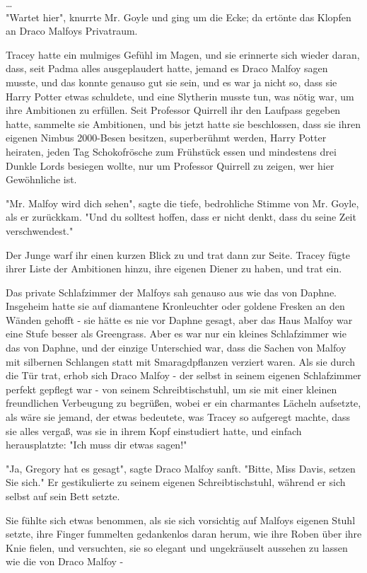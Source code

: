 {…\\ "Wartet hier", knurrte Mr. Goyle und ging um die Ecke; da ertönte das Klopfen an Draco Malfoys Privatraum.

Tracey hatte ein mulmiges Gefühl im Magen, und sie erinnerte sich wieder daran, dass, seit Padma alles ausgeplaudert hatte, jemand es Draco Malfoy sagen musste, und das konnte genauso gut sie sein, und es war ja nicht so, dass sie Harry Potter etwas schuldete, und eine Slytherin musste tun, was nötig war, um ihre Ambitionen zu erfüllen. Seit Professor Quirrell ihr den Laufpass gegeben hatte, sammelte sie Ambitionen, und bis jetzt hatte sie beschlossen, dass sie ihren eigenen Nimbus 2000-Besen besitzen, superberühmt werden, Harry Potter heiraten, jeden Tag Schokofrösche zum Frühstück essen und mindestens drei Dunkle Lords besiegen wollte, nur um Professor Quirrell zu zeigen, wer hier Gewöhnliche ist.

"Mr. Malfoy wird dich sehen", sagte die tiefe, bedrohliche Stimme von Mr. Goyle, als er zurückkam. "Und du solltest hoffen, dass er nicht denkt, dass du seine Zeit verschwendest."

Der Junge warf ihr einen kurzen Blick zu und trat dann zur Seite. Tracey fügte ihrer Liste der Ambitionen hinzu, ihre eigenen Diener zu haben, und trat ein.

Das private Schlafzimmer der Malfoys sah genauso aus wie das von Daphne. Insgeheim hatte sie auf diamantene Kronleuchter oder goldene Fresken an den Wänden gehofft - sie hätte es nie vor Daphne gesagt, aber das Haus Malfoy war eine Stufe besser als Greengrass. Aber es war nur ein kleines Schlafzimmer wie das von Daphne, und der einzige Unterschied war, dass die Sachen von Malfoy mit silbernen Schlangen statt mit Smaragdpflanzen verziert waren. Als sie durch die Tür trat, erhob sich Draco Malfoy - der selbst in seinem eigenen Schlafzimmer perfekt gepflegt war - von seinem Schreibtischstuhl, um sie mit einer kleinen freundlichen Verbeugung zu begrüßen, wobei er ein charmantes Lächeln aufsetzte, als wäre sie jemand, der etwas bedeutete, was Tracey so aufgeregt machte, dass sie alles vergaß, was sie in ihrem Kopf einstudiert hatte, und einfach herausplatzte: "Ich muss dir etwas sagen!"

"Ja, Gregory hat es gesagt", sagte Draco Malfoy sanft. "Bitte, Miss Davis, setzen\\ Sie sich." Er gestikulierte zu seinem eigenen Schreibtischstuhl, während er sich selbst auf sein Bett setzte.

Sie fühlte sich etwas benommen, als sie sich vorsichtig auf Malfoys eigenen Stuhl setzte, ihre Finger fummelten gedankenlos daran herum, wie ihre Roben über ihre Knie fielen, und versuchten, sie so elegant und ungekräuselt aussehen zu lassen wie die von Draco Malfoy -

}

